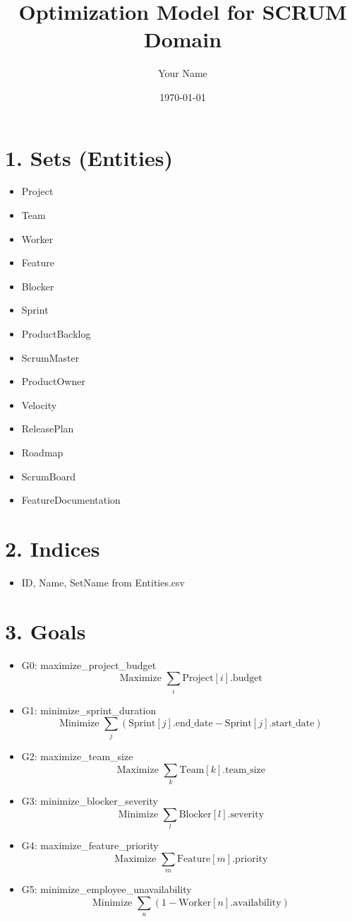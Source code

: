 \documentclass{article}
\title{Optimization Model for SCRUM Domain}
\author{Your Name}
\date{\today}
\begin{document}
\maketitle

\tableofcontents

\section{1. Sets (Entities)}
\begin{itemize}
    \item Project
    \item Team
    \item Worker
    \item Feature
    \item Blocker
    \item Sprint
    \item ProductBacklog
    \item ScrumMaster
    \item ProductOwner
    \item Velocity
    \item ReleasePlan
    \item Roadmap
    \item ScrumBoard
    \item FeatureDocumentation
\end{itemize}

\section{2. Indices}
\begin{itemize}
    \item ID, Name, SetName from Entities.csv
\end{itemize}

\section{3. Goals}
\begin{itemize}
    \item G0: maximize\_project\_budget
        \[
        \text{Maximize } \sum_{i} \text{Project}[i].\text{budget}
        \]
    \item G1: minimize\_sprint\_duration
        \[
        \text{Minimize } \sum_{j} (\text{Sprint}[j].\text{end\_date} - \text{Sprint}[j].\text{start\_date})
        \]
    \item G2: maximize\_team\_size
        \[
        \text{Maximize } \sum_{k} \text{Team}[k].\text{team\_size}
        \]
    \item G3: minimize\_blocker\_severity
        \[
        \text{Minimize } \sum_{l} \text{Blocker}[l].\text{severity}
        \]
    \item G4: maximize\_feature\_priority
        \[
        \text{Maximize } \sum_{m} \text{Feature}[m].\text{priority}
        \]
    \item G5: minimize\_employee\_unavailability
        \[
        \text{Minimize } \sum_{n} (1 - \text{Worker}[n].\text{availability})
        \]
\end{itemize}
\end{document}
